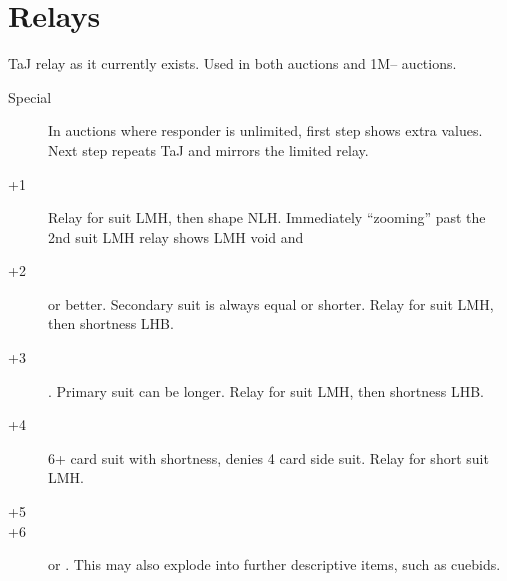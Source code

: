 \documentclass[tom-ari]{subfile}
\begin{document}
\section{Relays}

TaJ relay as it currently exists.  Used in both  auctions and 1M-- auctions.

\begin{description}
	\item[Special] In auctions where responder is unlimited, first step shows extra values.  Next step repeats TaJ and mirrors the limited relay.
	\item[+1]  Relay for \second suit LMH, then shape NLH.  Immediately ``zooming'' past the 2nd suit LMH relay shows LMH void and 
	\item[+2]  or better.  Secondary suit is always equal or shorter.  Relay for \second suit LMH, then shortness LHB.
	\item[+3] .  Primary suit can be longer.  Relay for \second suit LMH, then shortness LHB.
	\item[+4] 6+ card suit with shortness, denies 4 card side suit.  Relay for short suit LMH.
	\item[+5] 
	\item[+6]  or .  This may also explode into further descriptive items, such as cuebids.   
\end{description}
\end{document}
